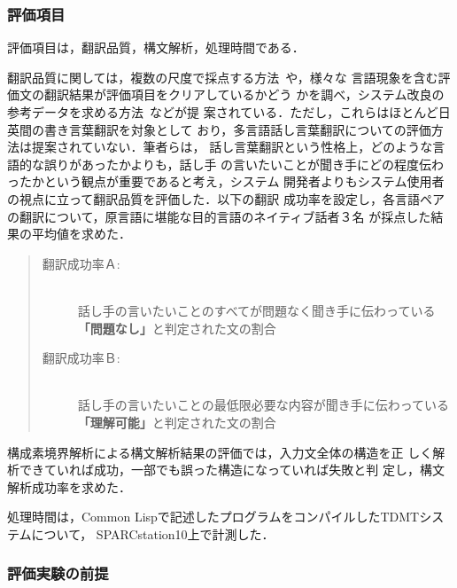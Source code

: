 \subsubsection{評価項目}

評価項目は，翻訳品質，構文解析，処理時間である．

翻訳品質に関しては，複数の尺度で採点する方法~\cite{Nag}や，様々な
言語現象を含む評価文の翻訳結果が評価項目をクリアしているかどう
かを調べ，システム改良の参考データを求める方法~\cite{Ikehara}などが提
案されている．ただし，これらはほとんど日英間の書き言葉翻訳を対象として
おり，多言語話し言葉翻訳についての評価方法は提案されていない．筆者らは，
話し言葉翻訳という性格上，どのような言語的な誤りがあったかよりも，話し手
の言いたいことが聞き手にどの程度伝わったかという観点が重要であると考え，システム
開発者よりもシステム使用者の視点に立って翻訳品質を評価した．以下の翻訳
成功率を設定し，各言語ペアの翻訳について，原言語に堪能な目的言語のネイティブ話者３名
が採点した結果の平均値を求めた．
\vspace*{6mm}

\begin{quote}
\begin{description}
\item[翻訳成功率Ａ:]　\\
話し手の言いたいことのすべてが問題なく聞き手に伝わっている\\
{\bf 「問題なし」}と判定された文の割合
\item[翻訳成功率Ｂ:]　\\
話し手の言いたいことの最低限必要な内容が聞き手に伝わっている\\
{\bf 「理解可能」}と判定された文の割合
\end{description}
\end{quote}
\vspace*{6mm}

構成素境界解析による構文解析結果の評価では，入力文全体の構造を正
しく解析できていれば成功，一部でも誤った構造になっていれば失敗と判
定し，構文解析成功率を求めた．

処理時間は，Common Lispで記述したプログラムをコンパイルしたTDMTシステムについて，
SPARCstation10上で計測した．

\subsubsection{評価実験の前提}

